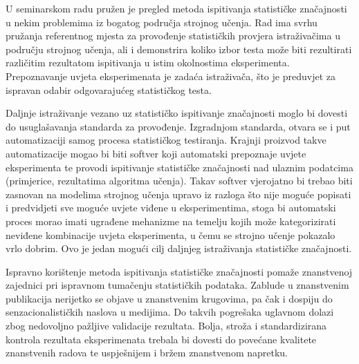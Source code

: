 U seminarskom radu pružen je pregled metoda ispitivanja statističke značajnosti u nekim problemima iz bogatog područja strojnog učenja. Rad ima svrhu pružanja referentnog mjesta za provođenje statističkih provjera istraživačima u području strojnog učenja, ali i demonstrira koliko izbor testa može biti rezultirati različitim rezultatom ispitivanja u istim okolnostima eksperimenta. Prepoznavanje uvjeta eksperimenata je zadaća istraživača, što je preduvjet za ispravan odabir odgovarajućeg statističkog testa. 

Daljnje istraživanje vezano uz statističko ispitivanje značajnosti moglo bi dovesti do usuglašavanja standarda za provođenje. Izgradnjom standarda, otvara se i put automatizaciji samog procesa statističkog testiranja. Krajnji proizvod takve automatizacije mogao bi biti softver koji automatski prepoznaje uvjete eksperimenta te provodi ispitivanje statističke značajnosti nad ulaznim podatcima (primjerice, rezultatima algoritma učenja). Takav softver vjerojatno bi trebao biti zasnovan na modelima strojnog učenja upravo iz razloga što nije moguće popisati i predvidjeti sve moguće uvjete viđene u eksperimentima, stoga bi automatski proces morao imati ugrađene mehanizme na temelju kojih može kategorizirati neviđene kombinacije uvjeta eksperimenta, u čemu se strojno učenje pokazalo vrlo dobrim. Ovo je jedan mogući cilj daljnjeg istraživanja statističke značajnosti.

Ispravno korištenje metoda ispitivanja statističke značajnosti pomaže znanstvenoj zajednici pri ispravnom tumačenju statističkih podataka. Zablude u znanstvenim publikacija nerijetko se objave u znanstvenim krugovima, pa čak i dospiju do senzacionalističkih naslova u medijima. Do takvih pogrešaka uglavnom dolazi zbog nedovoljno pažljive validacije rezultata. Bolja, stroža i standardizirana kontrola rezultata eksperimenata trebala bi dovesti do povećane kvalitete znanstvenih radova te uspješnijem i bržem znanstvenom napretku.